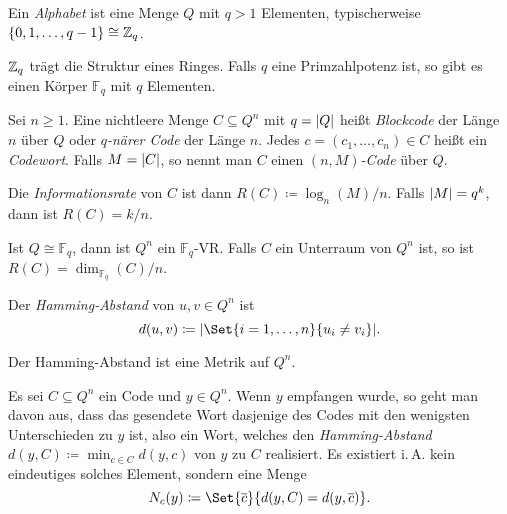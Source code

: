 \documentclass{cheat-sheet}
\newcommand{\F}{\mathbb{F}} %
\begin{document}





\begin{defn}
  Ein \emph{Alphabet} ist eine Menge $Q$ mit $q > 1$ Elementen, typischerweise $\{ 0, 1, \ldots, q-1 \} \cong \mathbb{Z}_q$.
\end{defn}

\begin{bem}
  $\mathbb{Z}_q$ trägt die Struktur eines Ringes.
  Falls $q$ eine Primzahlpotenz ist, so gibt es einen Körper $\F_q$ mit $q$ Elementen.
\end{bem}

\begin{defn}
  Sei $n \geq 1$. Eine nichtleere Menge $C \subseteq Q^n$ mit $q = \lvert Q\rvert$ heißt \emph{Blockcode} der Länge $n$ über $Q$ oder \emph{$q$-närer Code} der Länge $n$. Jedes $c = (c_1, \ldots, c_n) \in C$ heißt ein \emph{Codewort}.
  Falls $M = \lvert C\rvert$, so nennt man $C$ einen \emph{$(n, M)$-Code} über $Q$.
\end{defn}

\begin{defn}
  Die \emph{Informationsrate} von $C$ ist dann $R(C) \coloneqq \log_n(M) / n$.
  Falls $\lvert M\rvert = q^k$, dann ist $R(C) = k/n$.
\end{defn}

\begin{bem}
  Ist $Q \cong \F_q$, dann ist $Q^n$ ein $\F_q$-VR. Falls $C$ ein Unterraum von $Q^n$ ist, so ist $R(C) = \dim_{\F_q}(C) / n$.
\end{bem}

\begin{defn}
  Der \emph{Hamming-Abstand} von $u, v \in Q^n$ ist
  \[ d(u, v) \coloneqq \abs{\Set{i=1,\ldots,n}{u_i \neq v_i}}. \]
\end{defn}

\begin{lem}
  Der Hamming-Abstand ist eine Metrik auf $Q^n$.
\end{lem}

\begin{nota}
  Es sei $C \subseteq Q^n$ ein Code und $y \in Q^n$.
  Wenn $y$ empfangen wurde, so geht man davon aus, dass das gesendete Wort dasjenige des Codes mit den wenigsten Unterschieden zu $y$ ist, also ein Wort, welches den \emph{Hamming-Abstand} $d(y, C) \coloneqq \min_{c \in C} d(y, c)$ von $y$ zu $C$ realisiert.
  Es existiert i.\,A. kein eindeutiges solches Element, sondern eine Menge
  \[ N_c(y) \coloneqq \Set{\overline{c}}{d(y, C) = d(y, \overline{c})}. \]
\end{nota}
\end{document}
